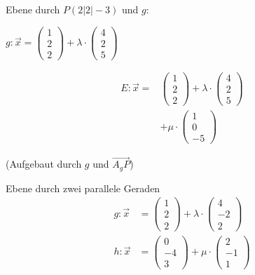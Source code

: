 \begin{frage}\LARGE
	Ebene durch $P(2|2|-3)$ und $g$: 
	
	$g:\vec{x}=\left(\begin{array}{c} 1 \\ 2 \\ 2\end{array} \right)+\lambda \cdot \left(\begin{array}{c} 4 \\ 2 \\ 5\end{array} \right)$\end{frage}
\begin{antwort}\begin{align*}
	E:\vec{x}=&\left(\begin{array}{c} 1 \\ 2 \\ 2\end{array} \right)+\lambda \cdot \left(\begin{array}{c} 4 \\ 2 \\ 5\end{array} \right)\\
	&+\mu \cdot \left(\begin{array}{c} 1 \\0 \\ -5\end{array} \right)
	\end{align*}
	\begin{center}
	(Aufgebaut durch $g$ und $\vec{A_gP}$)
	\end{center}\end{antwort}
\begin{frage}\LARGE
	Ebene durch zwei parallele Geraden
	\large
	\begin{align*}
	g:\vec{x}&=\left(\begin{array}{c} 1 \\ 2 \\ 2\end{array} \right)+\lambda \cdot \left(\begin{array}{c} 4 \\ -2 \\ 2\end{array} \right)\\
	h:\vec{x}&=\left(\begin{array}{c} 0 \\ -4 \\ 3\end{array} \right)+\mu \cdot \left(\begin{array}{c} 2 \\ -1 \\ 1\end{array} \right)
	\end{align*}\end{frage}
